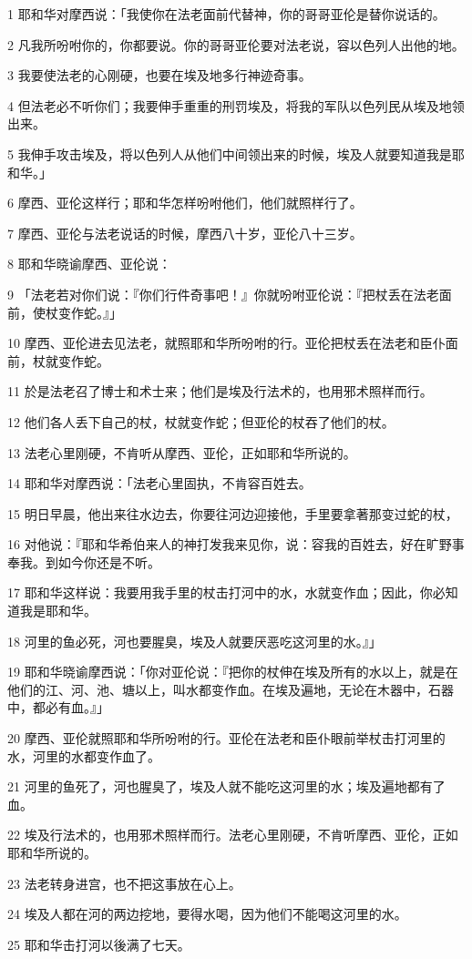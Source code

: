 \par 1 耶和华对摩西说：「我使你在法老面前代替神，你的哥哥亚伦是替你说话的。
\par 2 凡我所吩咐你的，你都要说。你的哥哥亚伦要对法老说，容以色列人出他的地。
\par 3 我要使法老的心刚硬，也要在埃及地多行神迹奇事。
\par 4 但法老必不听你们；我要伸手重重的刑罚埃及，将我的军队以色列民从埃及地领出来。
\par 5 我伸手攻击埃及，将以色列人从他们中间领出来的时候，埃及人就要知道我是耶和华。」
\par 6 摩西、亚伦这样行；耶和华怎样吩咐他们，他们就照样行了。
\par 7 摩西、亚伦与法老说话的时候，摩西八十岁，亚伦八十三岁。
\par 8 耶和华晓谕摩西、亚伦说：
\par 9 「法老若对你们说：『你们行件奇事吧！』你就吩咐亚伦说：『把杖丢在法老面前，使杖变作蛇。』」
\par 10 摩西、亚伦进去见法老，就照耶和华所吩咐的行。亚伦把杖丢在法老和臣仆面前，杖就变作蛇。
\par 11 於是法老召了博士和术士来；他们是埃及行法术的，也用邪术照样而行。
\par 12 他们各人丢下自己的杖，杖就变作蛇；但亚伦的杖吞了他们的杖。
\par 13 法老心里刚硬，不肯听从摩西、亚伦，正如耶和华所说的。
\par 14 耶和华对摩西说：「法老心里固执，不肯容百姓去。
\par 15 明日早晨，他出来往水边去，你要往河边迎接他，手里要拿著那变过蛇的杖，
\par 16 对他说：『耶和华希伯来人的神打发我来见你，说：容我的百姓去，好在旷野事奉我。到如今你还是不听。
\par 17 耶和华这样说：我要用我手里的杖击打河中的水，水就变作血；因此，你必知道我是耶和华。
\par 18 河里的鱼必死，河也要腥臭，埃及人就要厌恶吃这河里的水。』」
\par 19 耶和华晓谕摩西说：「你对亚伦说：『把你的杖伸在埃及所有的水以上，就是在他们的江、河、池、塘以上，叫水都变作血。在埃及遍地，无论在木器中，石器中，都必有血。』」
\par 20 摩西、亚伦就照耶和华所吩咐的行。亚伦在法老和臣仆眼前举杖击打河里的水，河里的水都变作血了。
\par 21 河里的鱼死了，河也腥臭了，埃及人就不能吃这河里的水；埃及遍地都有了血。
\par 22 埃及行法术的，也用邪术照样而行。法老心里刚硬，不肯听摩西、亚伦，正如耶和华所说的。
\par 23 法老转身进宫，也不把这事放在心上。
\par 24 埃及人都在河的两边挖地，要得水喝，因为他们不能喝这河里的水。
\par 25 耶和华击打河以後满了七天。

